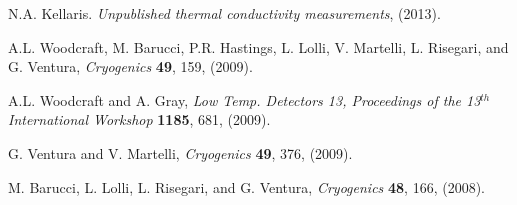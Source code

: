 \documentclass[final]{svjour2}
\begin{document}
\begin{thebibliography}{99}
N.A. Kellaris. {\it Unpublished thermal conductivity measurements}, (2013).

A.L. Woodcraft, M. Barucci, P.R. Hastings, L. Lolli, V. Martelli, L. Risegari, and G. Ventura, {\it Cryogenics} \textbf{49}, 159, (2009).

A.L. Woodcraft and A. Gray, {\it Low Temp. Detectors 13, Proceedings of the 13$^{th}$ International Workshop} \textbf{1185}, 681, (2009).

G. Ventura and V. Martelli, {\it Cryogenics} \textbf{49}, 376, (2009).

M. Barucci, L. Lolli, L. Risegari, and G. Ventura, {\it Cryogenics} \textbf{48}, 166, (2008).

\end{thebibliography}
\end{document}

